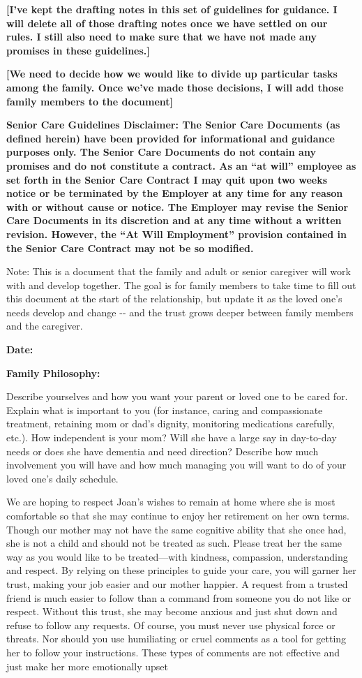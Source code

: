 \documentclass[]{article}
\date{}
\begin{document}
\textbf{{[}I've kept the drafting notes in this set of guidelines for
guidance. I will delete all of those drafting notes once we have settled
on our rules. I still also need to make sure that we have not made any
promises in these guidelines.{]}}

\textbf{{[}We need to decide how we would like to divide up particular
tasks among the family. Once we've made those decisions, I will add
those family members to the document{]}}

\textbf{Senior Care Guidelines Disclaimer: The Senior Care Documents (as
defined herein) have been provided for informational and guidance
purposes only. The Senior Care Documents do not contain any promises and
do not constitute a contract. As an ``at will'' employee as set forth in
the Senior Care Contract I may quit upon two weeks notice or be
terminated by the Employer at any time for any reason with or without
cause or notice. The Employer may revise the Senior Care Documents in
its discretion and at any time without a written revision. However, the
``At Will Employment'' provision contained in the Senior Care Contract
may not be so modified.}

Note: This is a document that the family and adult or senior caregiver
will work with and develop together. The goal is for family members to
take time to fill out this document at the start of the relationship,
but update it as the loved one's needs develop and change -\/- and the
trust grows deeper between family members and the caregiver.

\textbf{Date:}

\textbf{Family Philosophy:}

Describe yourselves and how you want your parent or loved one to be
cared for. Explain what is important to you (for instance, caring and
compassionate treatment, retaining mom or dad's dignity, monitoring
medications carefully, etc.). How independent is your mom? Will she have
a large say in day-to-day needs or does she have dementia and need
direction? Describe how much involvement you will have and how much
managing you will want to do of your loved one's daily schedule.

We are hoping to respect Joan's wishes to remain at home where she is
most comfortable so that she may continue to enjoy her retirement on her
own terms. Though our mother may not have the same cognitive ability
that she once had, she is not a child and should not be treated as such.
Please treat her the same way as you would like to be treated---with
kindness, compassion, understanding and respect. By relying on these
principles to guide your care, you will garner her trust, making your
job easier and our mother happier. A request from a trusted friend is
much easier to follow than a command from someone you do not like or
respect. Without this trust, she may become anxious and just shut down
and refuse to follow any requests. Of course, you must never use
physical force or threats. Nor should you use humiliating or cruel
comments as a tool for getting her to follow your instructions. These
types of comments are not effective and just make her more emotionally
upset
\end{document}
